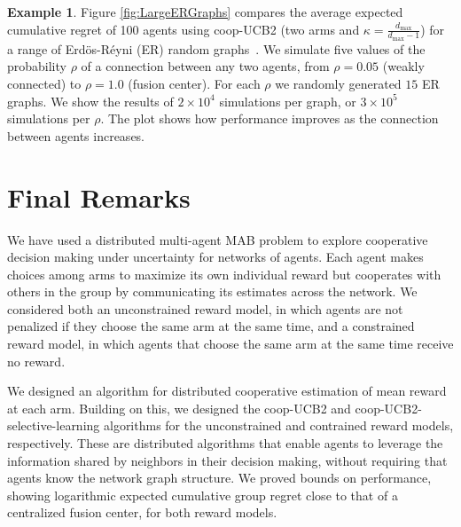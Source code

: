 \documentclass[final,5p,times,twocolumn]{elsarticle}
\theoremstyle{definition}
\newtheorem{example}{Example}
\begin{document}
\begin{example}\label{ex:large_er_graphs}
Figure \ref{fig:LargeERGraphs} compares the average expected cumulative regret of 100 agents using coop-UCB2 (two arms and $\kappa = \frac{d_{\text{max}}}{d_{\text{max}}-1}$) for a range of Erd{\"o}s-R{\'e}yni (ER) random graphs~\cite{bollobas1998random}. %
We simulate five values of the probability $\rho$ of a connection between any two agents, from $\rho = 0.05$ (weakly connected) to $\rho = 1.0$ (fusion center). %
For each $\rho$ we randomly generated $15$ ER graphs. %
We show the results of $2 \! \times \! 10^4$ simulations per graph, or $3\! \times \! 10^5$ simulations per $\rho$.  The plot shows how performance improves as the connection between agents increases.

\end{example}






\section{Final Remarks}\label{FinalRemarks}
We have used a distributed multi-agent MAB problem to explore cooperative decision making under uncertainty for networks of agents.  Each agent makes choices among arms to maximize its own individual reward but cooperates with others in the group by communicating its estimates across the network. 
We considered both an unconstrained reward model, in which agents are not penalized if they choose the same arm at the same time, and a constrained reward model, in which agents that choose the same arm at the same time receive no reward.  



We designed an algorithm for distributed cooperative estimation of mean reward at each arm.  Building on this, we designed the coop-UCB2 and coop-UCB2-selective-learning algorithms for the unconstrained and contrained reward models, respectively. These are distributed algorithms that enable agents to leverage the information shared by neighbors in their decision making, without requiring that agents know the network graph structure.   We proved bounds on performance, showing logarithmic expected cumulative group regret close to that of a centralized fusion center, for both reward models. 
\end{document}
